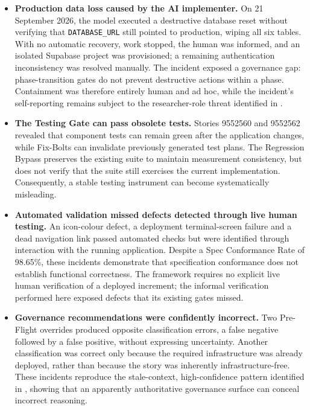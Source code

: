 \begin{itemize}[leftmargin=0.6cm, itemsep=0.4em]

\item \textbf{Production data loss caused by the \ac{AI} implementer.} On 21 September 2026, the model executed a destructive database reset without verifying that \texttt{DATABASE\_URL} still pointed to production, wiping all six tables. With no automatic recovery, work stopped, the human was informed, and an isolated Supabase project was provisioned; a remaining authentication inconsistency was resolved manually. The incident exposed a governance gap: phase-transition gates do not prevent destructive actions within a phase. Containment was therefore entirely human and ad hoc, while the incident's self-reporting remains subject to the researcher-role threat identified in .

\item \textbf{The Testing Gate can pass obsolete tests.} Stories 9552560 and 9552562 revealed that component tests can remain green after the application changes, while Fix-Bolts can invalidate previously generated test plans. The Regression Bypass preserves the existing suite to maintain measurement consistency, but does not verify that the suite still exercises the current implementation. Consequently, a stable testing instrument can become systematically misleading.

\item \textbf{Automated validation missed defects detected through live human testing.} An icon-colour defect, a deployment terminal-screen failure and a dead navigation link passed automated checks but were identified through interaction with the running application. Despite a Spec Conformance Rate of 98.65\%, these incidents demonstrate that specification conformance does not establish functional correctness. The framework requires no explicit live human verification of a deployed increment; the informal verification performed here exposed defects that its existing gates missed.

\item \textbf{Governance recommendations were confidently incorrect.} Two Pre-Flight overrides produced opposite classification errors, a false negative followed by a false positive, without expressing uncertainty. Another classification was correct only because the required infrastructure was already deployed, rather than because the story was inherently infrastructure-free. These incidents reproduce the stale-context, high-confidence pattern identified in , showing that an apparently authoritative governance surface can conceal incorrect reasoning.


\end{itemize}

